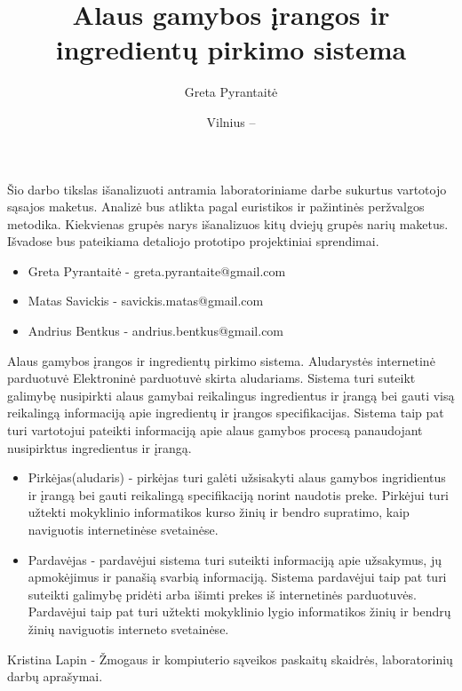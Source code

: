 \documentclass[oneside]{VUMIFPSkursinis}
\title{Alaus gamybos įrangos ir ingredientų pirkimo sistema}
\author{Greta Pyrantaitė}
\date{Vilnius – \the\year}
\begin{document}
\maketitle

Šio darbo tikslas išanalizuoti antramia laboratoriniame darbe sukurtus vartotojo sąsajos maketus. Analizė bus atlikta pagal euristikos ir pažintinės peržvalgos metodika. Kiekvienas grupės narys išanalizuos kitų dviejų grupės narių maketus. Išvadose bus pateikiama detaliojo prototipo projektiniai sprendimai.

\begin{itemize}
	\item{Greta Pyrantaitė - greta.pyrantaite@gmail.com}
	\item{Matas Savickis - savickis.matas@gmail.com}
	\item{Andrius Bentkus - andrius.bentkus@gmail.com}
\end{itemize}

\tableofcontents

		Alaus gamybos įrangos ir ingredientų pirkimo sistema.
		Aludarystės internetinė parduotuvė
		Elektroninė parduotuvė skirta aludariams.
		Sistema turi suteikt galimybę nusipirkti alaus gamybai reikalingus ingredientus ir įrangą bei gauti visą reikalingą informaciją apie ingredientų ir įrangos specifikacijas.
		Sistema taip pat turi vartotojui pateikti informaciją apie alaus gamybos procesą panaudojant nusipirktus ingredientus ir įrangą.
		\begin{itemize}
			\item{Pirkėjas(aludaris) - pirkėjas turi galėti užsisakyti alaus gamybos ingridientus ir įrangą bei gauti reikalingą specifikaciją norint naudotis preke.
				Pirkėjui turi užtekti mokyklinio informatikos kurso žinių ir bendro supratimo, kaip naviguotis internetinėse svetainėse.}
			\item{Pardavėjas - pardavėjui sistema turi suteikti informaciją apie užsakymus, jų apmokėjimus ir panašią svarbią informaciją.
				Sistema pardavėjui taip pat turi suteikti galimybę pridėti arba išimti prekes iš internetinės parduotuvės.
				Pardavėjui taip pat turi užtekti mokyklinio lygio informatikos žinių ir bendrų žinių naviguotis interneto svetainėse.}
		\end{itemize}
		Kristina Lapin - Žmogaus ir kompiuterio sąveikos paskaitų skaidrės, laboratorinių darbų aprašymai.
\iffalse XXXXXXXXXXXXXXXXXXXXXXXXXXXXXXXXXXXXXXXXXXXXXXXXXXXXXXXXXXXXXXXXXXXXXXXXXXXXXXXXXXXXXXXXXXXXXXXXXXXXXXXXXXXXXXXXXXXXXXXXXXXXXXXXXXXXXXX \fi
\end{document}
